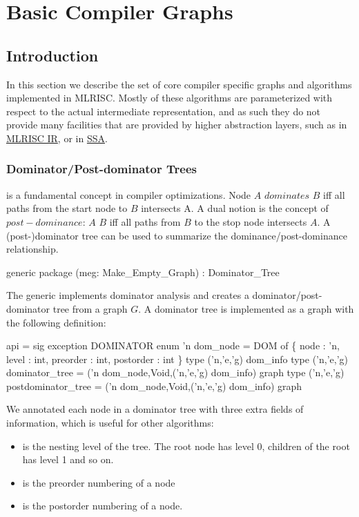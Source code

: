 \section{Basic Compiler Graphs}

\subsection{Introduction}
In this section we describe the set of core compiler specific graphs and
algorithms implemented in MLRISC.
Mostly of these algorithms are parameterized with respect
to the actual intermediate representation, and as such they
do not provide many facilities that are provided by higher abstraction
layers, such as in \href{mlrisc-ir.html}{MLRISC IR}, 
or in \href{SSA.html}{SSA}.

\subsubsection{Dominator/Post-dominator Trees}
is a fundamental concept in compiler optimizations.
Node $A$ $dominates$ $B$ 
iff all paths from the start node
to $B$ intersects A.  A dual notion is the concept of 
$post-dominance$:
$A$  $B$ iff all paths from $B$ to the stop node
intersects $A$.  A (post-)dominator tree can be used
to summarize the dominance/post-dominance relationship.

\begin{SML}
 generic package 
    (meg: Make_Empty_Graph) : Dominator_Tree
\end{SML}
   The generic implements dominator analysis and 
creates a dominator/post-dominator tree from a graph $G$.  A dominator tree is implemented as a graph
with the following definition:
\begin{SML}
 api  = sig
    exception DOMINATOR
    enum 'n dom_node =
       DOM of \{ node : 'n, level : int, preorder : int, postorder : int \}
    type ('n,'e,'g) dom_info
    type ('n,'e,'g) dominator_tree = ('n dom_node,Void,('n,'e,'g) dom_info) graph
    type ('n,'e,'g) postdominator_tree = ('n dom_node,Void,('n,'e,'g) dom_info) graph
\end{SML}

We annotated each node in
a dominator tree with three extra fields of information, which
is useful for other algorithms:
\begin{itemize}
  \item{} is the nesting level of the tree.  The root
  node has level 0, children of the root has level 1 and so on.
  \item{} is the preorder numbering of a node
  \item{} is the postorder numbering of a node.
\end{itemize}

